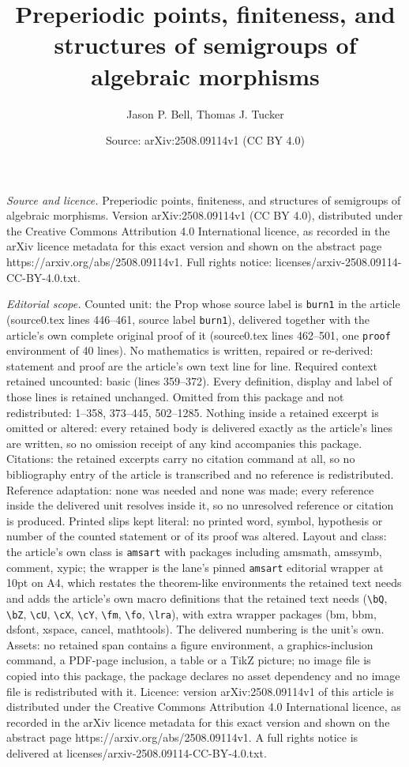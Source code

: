\documentclass[10pt,a4paper]{amsart}
\title[Preperiodic points, finiteness, and structures of semigroups]{Preperiodic points, finiteness, and structures of semigroups of algebraic morphisms}
\author{Jason P. Bell, Thomas J. Tucker}
\date{Source: arXiv:2508.09114v1 (CC BY 4.0)}
\begin{document}
\maketitle

\noindent\emph{Source and licence.} Preperiodic points, finiteness, and structures of semigroups of algebraic morphisms. Version arXiv:2508.09114v1 (CC BY 4.0), distributed under the Creative Commons Attribution 4.0 International licence, as recorded in the arXiv licence metadata for this exact version and shown on the abstract page https://arxiv.org/abs/2508.09114v1. Full rights notice: licenses/arxiv-2508.09114-CC-BY-4.0.txt.\par\smallskip

\noindent\textit{Editorial scope.} Counted unit: the Prop whose source label is \texttt{burn1} in the article (source0.tex lines 446--461, source label \texttt{burn1}), delivered together with the article's own complete original proof of it (source0.tex lines 462--501, one \texttt{proof} environment of 40 lines). No mathematics is written, repaired or re-derived: statement and proof are the article's own text line for line. Required context retained uncounted: basic (lines 359--372). Every definition, display and label of those lines is retained unchanged. Omitted from this package and not redistributed: 1--358, 373--445, 502--1285. Nothing inside a retained excerpt is omitted or altered: every retained body is delivered exactly as the article's lines are written, so no omission receipt of any kind accompanies this package. Citations: the retained excerpts carry no citation command at all, so no bibliography entry of the article is transcribed and no reference is redistributed. Reference adaptation: none was needed and none was made; every reference inside the delivered unit resolves inside it, so no unresolved reference or citation is produced. Printed slips kept literal: no printed word, symbol, hypothesis or number of the counted statement or of its proof was altered. Layout and class: the article's own class is \texttt{amsart} with packages including amsmath, amssymb, comment, xypic; the wrapper is the lane's pinned \texttt{amsart} editorial wrapper at 10pt on A4, which restates the theorem-like environments the retained text needs and adds the article's own macro definitions that the retained text needs (\texttt{\textbackslash bQ}, \texttt{\textbackslash bZ}, \texttt{\textbackslash cU}, \texttt{\textbackslash cX}, \texttt{\textbackslash cY}, \texttt{\textbackslash fm}, \texttt{\textbackslash fo}, \texttt{\textbackslash lra}), with extra wrapper packages (bm, bbm, dsfont, xspace, cancel, mathtools). The delivered numbering is the unit's own. Assets: no retained span contains a figure environment, a graphics-inclusion command, a PDF-page inclusion, a table or a TikZ picture; no image file is copied into this package, the package declares no asset dependency and no image file is redistributed with it. Licence: version arXiv:2508.09114v1 of this article is distributed under the Creative Commons Attribution 4.0 International licence, as recorded in the arXiv licence metadata for this exact version and shown on the abstract page https://arxiv.org/abs/2508.09114v1. A full rights notice is delivered at licenses/arxiv-2508.09114-CC-BY-4.0.txt. 
\end{document}
